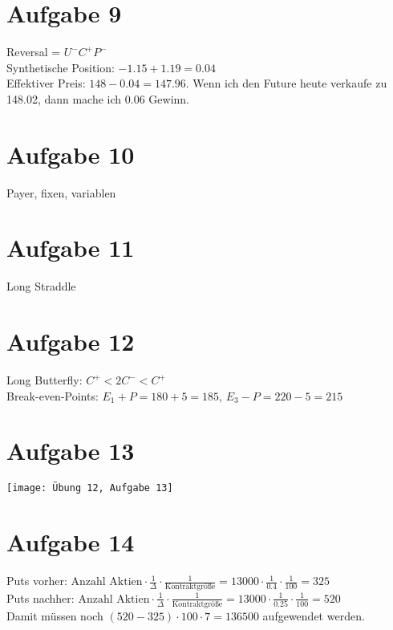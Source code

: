\documentclass{article}
\begin{document}
	\section*{Aufgabe 9}
	Reversal = $U^-C^+P^-$ \\
	Synthetische Position: $-1.15 + 1.19 = 0.04$ \\
	Effektiver Preis: $148 - 0.04 = 147.96$. Wenn ich den Future heute verkaufe zu 148.02, dann mache ich 0.06 Gewinn.
	
	\section*{Aufgabe 10}
	Payer, fixen, variablen
	
	\section*{Aufgabe 11}
	Long Straddle
	
	\section*{Aufgabe 12}
	Long Butterfly: $C^+ < 2C^- < C^+$ \\
	Break-even-Points: $E_1+P = 180 + 5 = 185$, $E_3-P = 220 - 5 = 215$
	
	\section*{Aufgabe 13}
	\begin{center}
		\texttt{[image: Übung 12, Aufgabe 13]}
	\end{center}
	
	\section*{Aufgabe 14}
	Puts vorher: $\text{Anzahl Aktien}\cdot\frac{1}{\Delta}\cdot\frac{1}{\text{Kontraktgröße}} = 13000\cdot\frac{1}{0.4}\cdot\frac{1}{100} = 325$ \\
	Puts nachher: $\text{Anzahl Aktien}\cdot\frac{1}{\Delta}\cdot\frac{1}{\text{Kontraktgröße}} = 13000\cdot\frac{1}{0.25}\cdot\frac{1}{100} = 520$ \\
	Damit müssen noch $(520-325)\cdot 100\cdot 7 = 136500$ aufgewendet werden.
	
\end{document}
